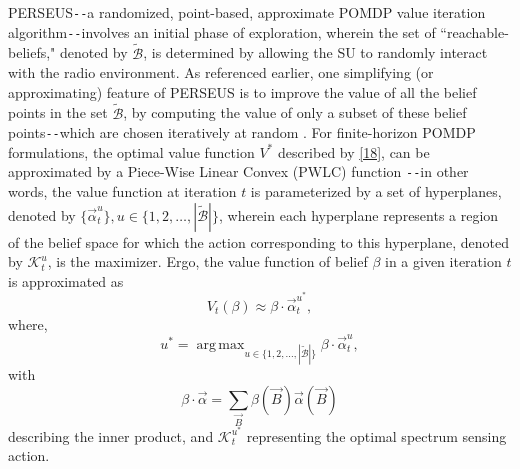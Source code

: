 \documentclass[12pt, draftcls, onecolumn]{IEEEtran}
\DeclareMathOperator*{\argmax}{arg\,max}
\begin{document}
PERSEUS\texttt{-{}-}a randomized, point-based, approximate POMDP value iteration algorithm\texttt{-{}-}involves an initial phase of exploration, wherein the set of ``reachable-beliefs," denoted by $\tilde{\mathcal{B}}$, is determined by allowing the SU to randomly interact with the radio environment. As referenced earlier, one simplifying (or approximating) feature of PERSEUS is to improve the value of all the belief points in the set $\tilde{\mathcal{B}}$, by computing the value of only a subset of these belief points\texttt{-{}-}which are chosen iteratively at random \cite{WCL:paper}. For finite-horizon POMDP formulations, the optimal value function $V^{*}$ described by \eqref{18}, can be approximated by a Piece-Wise Linear Convex (PWLC) function \cite{WCL:13}\texttt{-{}-}in other words, the value function at iteration $t$ is parameterized by a set of hyperplanes, denoted by $\{\vec{\alpha}_{t}^{u}\},u{\in}\{1,2,\dots,|\tilde{\mathcal{B}}|\}$, wherein each hyperplane represents a region of the belief space for which the action corresponding to this hyperplane, denoted by $\mathcal{K}_{t}^{u}$, is the maximizer. Ergo, the value function of belief $\beta$ in a given iteration $t$ is approximated as
\begin{equation}\label{22}
    V_{t}(\beta) \approx \beta \cdot \vec{\alpha}_{t}^{u^{*}},
\end{equation}
where,
\begin{equation}\label{23}
    u^{*}=\argmax_{u \in \{1,2,\dots,|\tilde{\mathcal{B}}|\}}\beta \cdot \vec{\alpha}_{t}^{u},
\end{equation}
with
\begin{equation}\label{24}
    \beta \cdot \vec{\alpha}=\sum_{\vec{B}}\beta(\vec{B})\vec{\alpha}(\vec{B})
\end{equation}
describing the inner product, and $\mathcal{K}_{t}^{u^{*}}$ representing the optimal spectrum sensing action.
\end{document}
